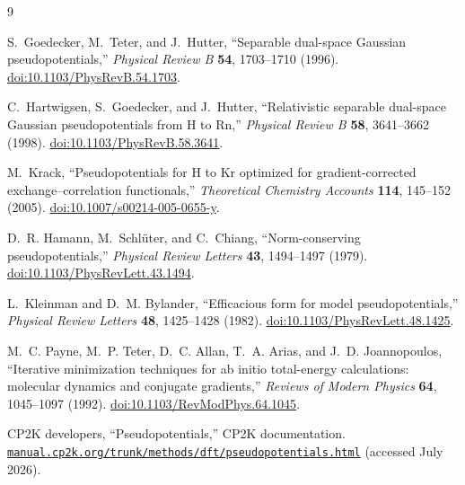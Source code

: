 \documentclass[10pt,twocolumn]{article}
\begin{document}
\begin{thebibliography}{9}

S.~Goedecker, M.~Teter, and J.~Hutter,
``Separable dual-space Gaussian pseudopotentials,''
\emph{Physical Review B} \textbf{54}, 1703--1710 (1996).
\href{https://doi.org/10.1103/PhysRevB.54.1703}
{doi:10.1103/PhysRevB.54.1703}.

C.~Hartwigsen, S.~Goedecker, and J.~Hutter,
``Relativistic separable dual-space Gaussian pseudopotentials from H to Rn,''
\emph{Physical Review B} \textbf{58}, 3641--3662 (1998).
\href{https://doi.org/10.1103/PhysRevB.58.3641}
{doi:10.1103/PhysRevB.58.3641}.

M.~Krack,
``Pseudopotentials for H to Kr optimized for gradient-corrected
exchange--correlation functionals,''
\emph{Theoretical Chemistry Accounts} \textbf{114}, 145--152 (2005).
\href{https://doi.org/10.1007/s00214-005-0655-y}
{doi:10.1007/s00214-005-0655-y}.

D.~R. Hamann, M.~Schl\"uter, and C.~Chiang,
``Norm-conserving pseudopotentials,''
\emph{Physical Review Letters} \textbf{43}, 1494--1497 (1979).
\href{https://doi.org/10.1103/PhysRevLett.43.1494}
{doi:10.1103/PhysRevLett.43.1494}.

L.~Kleinman and D.~M. Bylander,
``Efficacious form for model pseudopotentials,''
\emph{Physical Review Letters} \textbf{48}, 1425--1428 (1982).
\href{https://doi.org/10.1103/PhysRevLett.48.1425}
{doi:10.1103/PhysRevLett.48.1425}.

M.~C. Payne, M.~P. Teter, D.~C. Allan, T.~A. Arias, and J.~D. Joannopoulos,
``Iterative minimization techniques for ab initio total-energy
calculations: molecular dynamics and conjugate gradients,''
\emph{Reviews of Modern Physics} \textbf{64}, 1045--1097 (1992).
\href{https://doi.org/10.1103/RevModPhys.64.1045}
{doi:10.1103/RevModPhys.64.1045}.

CP2K developers, ``Pseudopotentials,'' CP2K documentation.
\href{https://manual.cp2k.org/trunk/methods/dft/pseudopotentials.html}
{\nolinkurl{manual.cp2k.org/trunk/methods/dft/pseudopotentials.html}}
(accessed July 2026).

\end{thebibliography}
\end{document}
